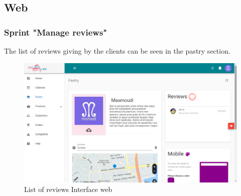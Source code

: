\documentclass[12pt,a4paper]{report}
\begin{document}
\subsection{Web}
\subsubsection*{Sprint "Manage reviews"}
The list of reviews giving by the clients can be seen in the pastry section.
\begin{figure}[H]
	\centering
	\vspace*{1in}
	\includegraphics[width=7in,keepaspectratio]{edit-pastry.png}
	\caption{List of reviews Interface web}
	\label{avis-interface}
\end{figure}
\clearpage
\end{document}
